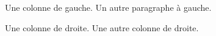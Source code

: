 \begin{pairs}
  \begin{Leftside}
    \beginnumbering
    \pstart
    Une colonne de gauche.
    \pend
    \pstart
    Un autre paragraphe à gauche.
    \pend
    \endnumbering
  \end{Leftside}
  \begin{Rightside}
    \beginnumbering
    \pstart
    Une colonne de droite.
    \pend
    \pstart
    Une autre colonne de droite.
    \pend
    \endnumbering
  \end{Rightside}
\end{pairs}
\Columns
